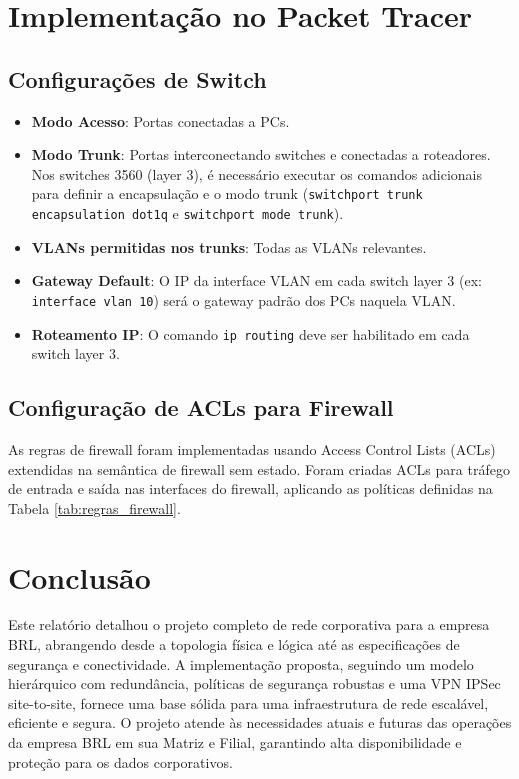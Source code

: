 \documentclass[a4paper, 12pt]{article}
\begin{document}
\section{Implementação no Packet Tracer}
\label{sec:implementacao}

\subsection{Configurações de Switch}
\label{subsec:config-switch}

\begin{itemize}
    \item \textbf{Modo Acesso}: Portas conectadas a PCs.
    \item \textbf{Modo Trunk}: Portas interconectando switches e conectadas a roteadores. Nos switches 3560 (layer 3), é necessário executar os comandos adicionais para definir a encapsulação e o modo trunk (\texttt{switchport trunk encapsulation dot1q} e \texttt{switchport mode trunk}).
    \item \textbf{VLANs permitidas nos trunks}: Todas as VLANs relevantes.
    \item \textbf{Gateway Default}: O IP da interface VLAN em cada switch layer 3 (ex: \texttt{interface vlan 10}) será o gateway padrão dos PCs naquela VLAN.
    \item \textbf{Roteamento IP}: O comando \texttt{ip routing} deve ser habilitado em cada switch layer 3.
\end{itemize}

\subsection{Configuração de ACLs para Firewall}
\label{subsec:acls}

As regras de firewall foram implementadas usando Access Control Lists (ACLs) extendidas na semântica de firewall sem estado. Foram criadas ACLs para tráfego de entrada e saída nas interfaces do firewall, aplicando as políticas definidas na Tabela \ref{tab:regras_firewall}.

\section{Conclusão}
\label{sec:conclusao}

Este relatório detalhou o projeto completo de rede corporativa para a empresa BRL, abrangendo desde a topologia física e lógica até as especificações de segurança e conectividade. A implementação proposta, seguindo um modelo hierárquico com redundância, políticas de segurança robustas e uma VPN IPSec site-to-site, fornece uma base sólida para uma infraestrutura de rede escalável, eficiente e segura. O projeto atende às necessidades atuais e futuras das operações da empresa BRL em sua Matriz e Filial, garantindo alta disponibilidade e proteção para os dados corporativos.
\end{document}
